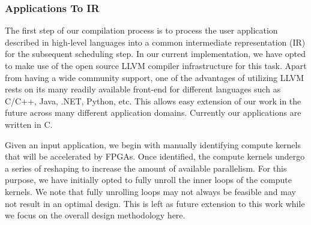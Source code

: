 \subsubsection{Applications To IR}
The first step of our compilation process is to process the user application described in high-level languages into a common intermediate representation (IR) for the subsequent scheduling step.  In our current implementation, we have opted to make use of the open source LLVM compiler infrastructure \cite{llvm} for this task.  Apart from having a wide community support, one of the advantages of utilizing LLVM rests on its many readily available front-end for different languages such as C/C++, Java, .NET, Python, etc.  This allows easy extension of our work in the future across many different application domains.  Currently our applications are written in C.

Given an input application, we begin with manually identifying compute kernels that will be accelerated by FPGAs.  Once identified, the compute kernels undergo a series of reshaping to increase the amount of available parallelism.  For this purpose, we have initially opted to fully unroll the inner loops of the compute kernels.  We note that fully unrolling loops may not always be feasible and may not result in an optimal design.  This is left as future extension to this work while we focus on the overall design methodology here.



